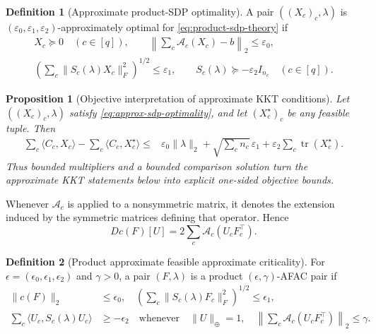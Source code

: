 \documentclass[11pt]{article}
\newtheorem{proposition}{Proposition}
\theoremstyle{definition}
\newtheorem{definition}{Definition}
\theoremstyle{remark}
\begin{document}
\begin{definition}[Approximate product-SDP optimality]
\label{def:approx-sdp-optimality}
A pair $((X_c)_c,\lambda)$ is
$(\varepsilon_0,\varepsilon_1,\varepsilon_2)$-approximately optimal for
\eqref{eq:product-sdp-theory} if
\begin{equation}
\begin{gathered}
  X_c\succeq0\quad(c\in[q]),\qquad
  \left\|\sum_c\mathcal A_c(X_c)-b\right\|_2\leq\varepsilon_0,\\
  \left(\sum_c\|S_c(\lambda)X_c\|_F^2\right)^{1/2}
    \leq\varepsilon_1,\qquad
  S_c(\lambda)\succeq-\varepsilon_2I_{n_c}\quad(c\in[q]).
\end{gathered}
\label{eq:approx-sdp-optimality}
\end{equation}
\end{definition}

\begin{proposition}[Objective interpretation of approximate KKT conditions]
\label{prop:approx-kkt-gap}
Let $((X_c)_c,\lambda)$ satisfy
\eqref{eq:approx-sdp-optimality}, and let $(X_c^\star)_c$ be any feasible
tuple.  Then
\begin{equation}
\begin{aligned}
  \sum_c\langle C_c,X_c\rangle
  -\sum_c\langle C_c,X_c^\star\rangle
  \leq{}&
  \varepsilon_0\|\lambda\|_2
  +\sqrt{\sum_c n_c}\,\varepsilon_1 +\varepsilon_2\sum_c\operatorname{tr}(X_c^\star).
\end{aligned}
\label{eq:approx-kkt-objective-gap}
\end{equation}
Thus bounded multipliers and a bounded comparison solution turn the
approximate KKT statements below into explicit one-sided objective bounds.
\end{proposition}

Whenever $\mathcal A_c$ is applied to a nonsymmetric matrix, it denotes the
extension induced by the symmetric matrices defining that operator.  Hence
\[
  Dc(F)[U]
  =2\sum_c\mathcal A_c(U_cF_c^\top).
\]

\begin{definition}[Product approximate feasible approximate criticality]
\label{def:afac}
For $\epsilon=(\epsilon_0,\epsilon_1,\epsilon_2)$ and $\gamma>0$, a pair
$(F,\lambda)$ is a product $(\epsilon,\gamma)$-AFAC pair if
\begin{align}
  \|c(F)\|_2&\leq\epsilon_0,
   \quad \left(\sum_c\|S_c(\lambda)F_c\|_F^2\right)^{1/2}
  \leq\epsilon_1,
  \label{eq:product-afac-first}\\
  \sum_c\langle U_c,S_c(\lambda)U_c\rangle
  &\geq-\epsilon_2
  \quad\text{whenever}\quad
  \|U\|_\oplus=1,\quad
  \left\|\sum_c\mathcal A_c(U_cF_c^\top)\right\|_2\leq\gamma.
  \label{eq:product-afac-second}
\end{align}
\end{definition}
\end{document}
